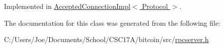 Implemented in \hyperlink{class_accepted_connection_impl_ab15396a413e40f947b7d527a2afe37fa}{Accepted\+Connection\+Impl$<$ Protocol $>$}.



The documentation for this class was generated from the following file\+:\begin{DoxyCompactItemize}
\item 
C\+:/\+Users/\+Joe/\+Documents/\+School/\+C\+S\+C17\+A/bitcoin/src/\hyperlink{rpcserver_8h}{rpcserver.\+h}\end{DoxyCompactItemize}
